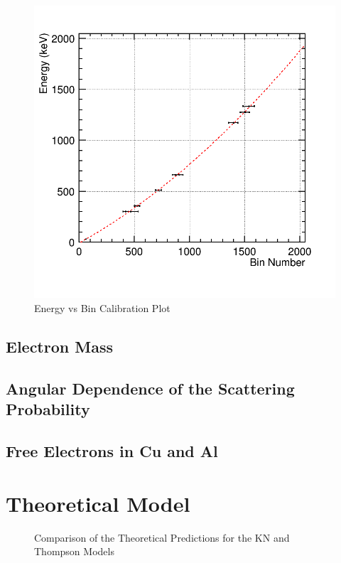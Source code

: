 \documentclass[%
 reprint,
 amsmath,amssymb,
 aps,
 pra,
]{revtex4-1}
\begin{document}
\begin{figure}[H]
\centering	
	\includegraphics[scale=0.3]{BinvEnergy.png}
	\caption{Energy vs Bin Calibration Plot}
	\label{Fig:EvBin}
\end{figure}

\subsection{Electron Mass}

\subsection{Angular Dependence of the Scattering Probability}

\subsection{Free Electrons in Cu and Al}

\section{Theoretical Model}

\begin{figure}[H]
	\centering
	\caption{Comparison of the Theoretical Predictions for the KN and Thompson Models}
	\label{KN_vs_Thompson_Theory}
\end{figure}
\end{document}

